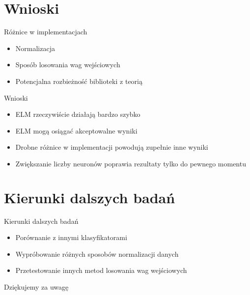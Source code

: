 \documentclass{beamer}
\begin{document}
\section{Wnioski}
\begin{frame}{Różnice w implementacjach}
\begin{itemize}
\item Normalizacja
\item Sposób losowania wag wejściowych
\item Potencjalna rozbieżność biblioteki z teorią
\end{itemize}
\end{frame}

\begin{frame}{Wnioski}
\begin{itemize}
\item ELM rzeczywiście działają bardzo szybko
\item ELM mogą osiągać akceptowalne wyniki
\item Drobne różnice w implementacji powodują zupełnie inne wyniki
\item Zwiększanie liczby neuronów poprawia rezultaty tylko do pewnego momentu
\end{itemize}
\end{frame}

\section{Kierunki dalszych badań}
\begin{frame}{Kierunki dalszych badań}
\begin{itemize}
\item Porównanie z innymi klasyfikatorami
\item Wypróbowanie różnych sposobów normalizacji danych
\item Przetestowanie innych metod losowania wag wejściowych
\end{itemize}
\end{frame}

\begin{frame}
\begin{center}
\huge{Dziękujemy za uwagę}
\end{center}
\end{frame}
\end{document}
